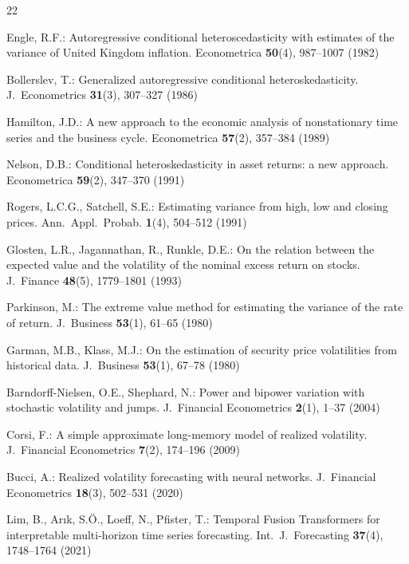 \documentclass[runningheads]{llncs}
\begin{document}
\begin{thebibliography}{22}

Engle, R.F.: Autoregressive conditional heteroscedasticity with estimates of the variance of United Kingdom inflation. Econometrica \textbf{50}(4), 987--1007 (1982)

Bollerslev, T.: Generalized autoregressive conditional heteroskedasticity. J.~Econometrics \textbf{31}(3), 307--327 (1986)

Hamilton, J.D.: A new approach to the economic analysis of nonstationary time series and the business cycle. Econometrica \textbf{57}(2), 357--384 (1989)

Nelson, D.B.: Conditional heteroskedasticity in asset returns: a new approach. Econometrica \textbf{59}(2), 347--370 (1991)

Rogers, L.C.G., Satchell, S.E.: Estimating variance from high, low and closing prices. Ann.~Appl.~Probab. \textbf{1}(4), 504--512 (1991)

Glosten, L.R., Jagannathan, R., Runkle, D.E.: On the relation between the expected value and the volatility of the nominal excess return on stocks. J.~Finance \textbf{48}(5), 1779--1801 (1993)

Parkinson, M.: The extreme value method for estimating the variance of the rate of return. J.~Business \textbf{53}(1), 61--65 (1980)

Garman, M.B., Klass, M.J.: On the estimation of security price volatilities from historical data. J.~Business \textbf{53}(1), 67--78 (1980)

Barndorff-Nielsen, O.E., Shephard, N.: Power and bipower variation with stochastic volatility and jumps. J.~Financial Econometrics \textbf{2}(1), 1--37 (2004)

Corsi, F.: A simple approximate long-memory model of realized volatility. J.~Financial Econometrics \textbf{7}(2), 174--196 (2009)

Bucci, A.: Realized volatility forecasting with neural networks. J.~Financial Econometrics \textbf{18}(3), 502--531 (2020)

Lim, B., Ar{\i}k, S.\"O., Loeff, N., Pfister, T.: Temporal Fusion Transformers for interpretable multi-horizon time series forecasting. Int.~J.~Forecasting \textbf{37}(4), 1748--1764 (2021)


\end{thebibliography}
\end{document}

